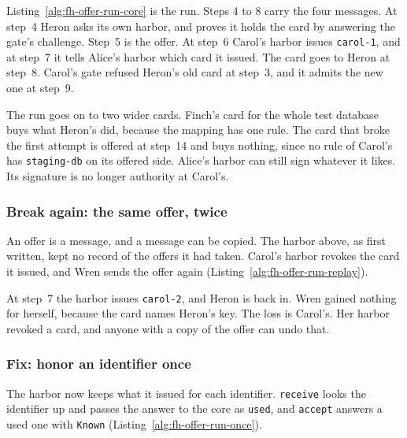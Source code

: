 Listing~\ref{alg:fh-offer-run-core} is the run. Steps 4 to 8 carry the
four messages. At step~4 Heron asks its own harbor, and proves it holds
the card by answering the gate's challenge. Step~5 is the offer. At
step~6 Carol's harbor issues \texttt{carol-1}, and at step~7 it tells
Alice's harbor which card it issued. The card goes to Heron at step~8.
Carol's gate refused Heron's old card at step~3, and it admits the new
one at step~9.

The run goes on to two wider cards. Finch's card for the whole test
database buys what Heron's did, because the mapping has one rule. The
card that broke the first attempt is offered at step~14 and buys nothing,
since no rule of Carol's has \texttt{staging-db} on its offered side.
Alice's harbor can still sign whatever it likes. Its signature is no
longer authority at Carol's.


\subsubsection{Break again: the same offer, twice}

An offer is a message, and a message can be copied. The harbor above, as
first written, kept no record of the offers it had taken. Carol's harbor
revokes the card it issued, and Wren sends the offer again
(Listing~\ref{alg:fh-offer-run-replay}).


At step~7 the harbor issues \texttt{carol-2}, and Heron is back in. Wren
gained nothing for herself, because the card names Heron's key. The loss
is Carol's. Her harbor revoked a card, and anyone with a copy of the offer
can undo that.

\subsubsection{Fix: honor an identifier once}

The harbor now keeps what it issued for each identifier.
\texttt{receive} looks the identifier up and passes the answer to the
core as \texttt{used}, and \texttt{accept} answers a used one with
\texttt{Known} (Listing~\ref{alg:fh-offer-run-once}).


